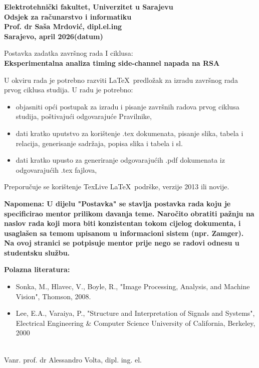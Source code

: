 \thispagestyle{plain}
\begin{flushleft}
\textbf{Elektrotehnički fakultet, Univerzitet u Sarajevu}\\
\textbf{Odsjek za računarstvo i informatiku}\\
\textbf{Prof. dr Saša Mrdović, dipl.el.ing}\\


\textbf{Sarajevo, april 2026(datum) }\\
\end{flushleft}

\begin{center}
\vspace{2cm}
{\Large Postavka zadatka završnog rada I ciklusa:}\\
\vspace{0.2cm}
{\large \textbf{Eksperimentalna analiza timing side-channel napada na RSA}}
\end{center}

\vspace{0.5cm}
U okviru rada je potrebno razviti \LaTeX\ predložak za izradu završnog rada prvog ciklusa studija. U radu je potrebno:
\begin{itemize}
\item objasniti opći postupak za izradu i pisanje završnih radova prvog ciklusa studija, poštivajući odgovarajuće Pravilnike,
\item dati kratko uputstvo za korištenje .tex dokumenata, pisanje slika, tabela i relacija, generisanje sadržaja, popisa slika i tabela i sl.
\item dati kratko upusto za generiranje odgovarajućih .pdf dokumenata iz odgovarajućih .tex fajlova,
\end{itemize}
Preporučuje se korištenje TexLive \LaTeX\ podrške, verzije 2013 ili novije.

\textbf{Napomena: U dijelu "Postavka" se stavlja postavka rada koju je specificirao mentor prilikom davanja teme. Naročito obratiti pažnju na naslov rada koji mora biti konzistentan tokom cijelog dokumenta, i usaglašen sa temom upisanom u informacioni sistem (npr. Zamger). Na ovoj stranici se potpisuje mentor prije nego se radovi odnesu u studentsku službu.}


\vspace{1cm}
\textbf{Polazna literatura:}

\begin{itemize}
\item[]  [1] Sonka, M., Hlavec, V., Boyle, R., "Image Processing, Analysis, and Machine Vision", Thomson, 2008.
\item[] [2] Lee, E.A., Varaiya, P., "Structure and Interpretation of Signals and Systems", Electrical Engineering \& Computer Science University of California, Berkeley, 2000

\end{itemize}


\begin{center}
\vspace{2cm}
\makebox[8cm]{\hrulefill} \\
Vanr. prof. dr Alessandro Volta, dipl. ing. el.\\
\end{center}





